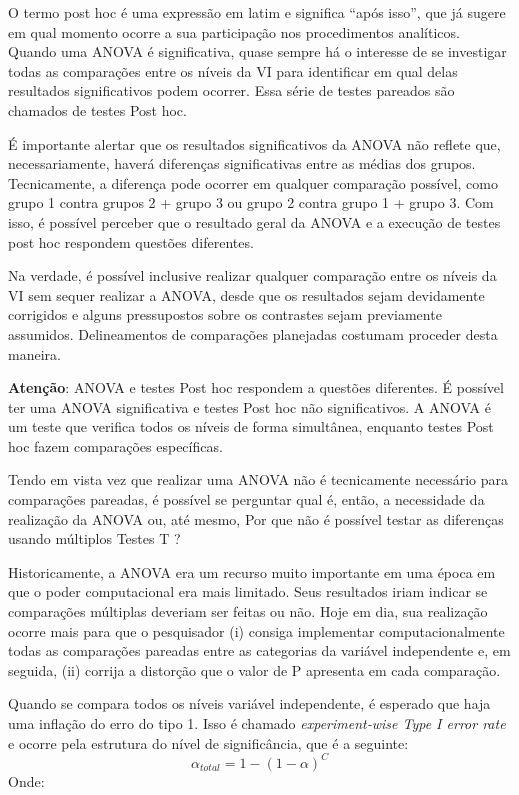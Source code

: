 \documentclass[
]{book}
\begin{document}
O termo post hoc é uma expressão em latim e significa ``após isso'', que
já sugere em qual momento ocorre a sua participação nos procedimentos
analíticos. Quando uma ANOVA é significativa, quase sempre há o
interesse de se investigar todas as comparações entre os níveis da VI
para identificar em qual delas resultados significativos podem ocorrer.
Essa série de testes pareados são chamados de testes Post hoc.

É importante alertar que os resultados significativos da ANOVA não
reflete que, necessariamente, haverá diferenças significativas entre as
médias dos grupos. Tecnicamente, a diferença pode ocorrer em qualquer
comparação possível, como grupo 1 contra grupos 2 + grupo 3 ou grupo 2
contra grupo 1 + grupo 3. Com isso, é possível perceber que o resultado
geral da ANOVA e a execução de testes post hoc respondem questões
diferentes.

Na verdade, é possível inclusive realizar qualquer comparação entre os
níveis da VI sem sequer realizar a ANOVA, desde que os resultados sejam
devidamente corrigidos e alguns pressupostos sobre os contrastes sejam
previamente assumidos. Delineamentos de comparações planejadas costumam
proceder desta maneira.

\begin{warning}

\textbf{Atenção}: ANOVA e testes Post hoc respondem a questões
diferentes. É possível ter uma ANOVA significativa e testes Post hoc não
significativos. A ANOVA é um teste que verifica todos os níveis de forma
simultânea, enquanto testes Post hoc fazem comparações específicas.

\end{warning}

Tendo em vista vez que realizar uma ANOVA não é tecnicamente necessário
para comparações pareadas, é possível se perguntar qual é, então, a
necessidade da realização da ANOVA ou, até mesmo, Por que não é possível
testar as diferenças usando múltiplos Testes T ?

Historicamente, a ANOVA era um recurso muito importante em uma época em
que o poder computacional era mais limitado. Seus resultados iriam
indicar se comparações múltiplas deveriam ser feitas ou não. Hoje em
dia, sua realização ocorre mais para que o pesquisador (i) consiga
implementar computacionalmente todas as comparações pareadas entre as
categorias da variável independente e, em seguida, (ii) corrija a
distorção que o valor de P apresenta em cada comparação.

Quando se compara todos os níveis variável independente, é esperado que
haja uma inflação do erro do tipo 1. Isso é chamado
\emph{experiment‑wise Type I error rate} e ocorre pela estrutura do
nível de significância, que é a seguinte:
\[\alpha_{total}=1-(1-\alpha)^C\] Onde:
\end{document}
